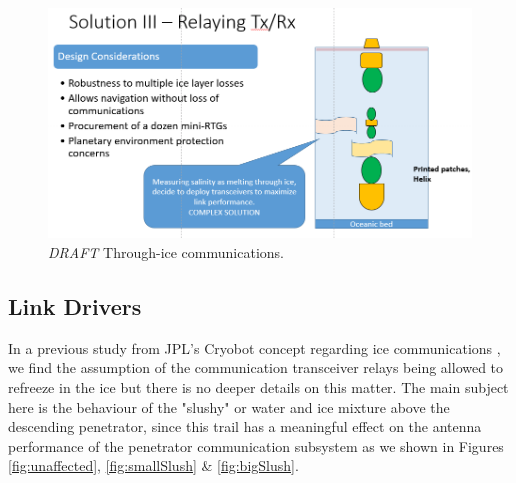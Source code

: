 \begin{figure}[htb]
	\centering
	\includegraphics[width=\textwidth]{figures/comms/iceLink-relay}
	\caption{\textit{DRAFT} Through-ice communications.}
	\label{fig:through-ice_comms_relay}
\end{figure}

\subsection{Link Drivers}






In a previous study from JPL's Cryobot concept regarding ice communications \cite{iceLink-scott}, we find the assumption of the communication transceiver relays being allowed to refreeze in the ice but there is no deeper details on this matter. The main subject here is the behaviour of the "slushy" or water and ice mixture above the descending penetrator, since this trail has a meaningful effect on the antenna performance of the penetrator communication subsystem as we shown in Figures \ref{fig:unaffected}, \ref{fig:smallSlush} \& \ref{fig:bigSlush}.


